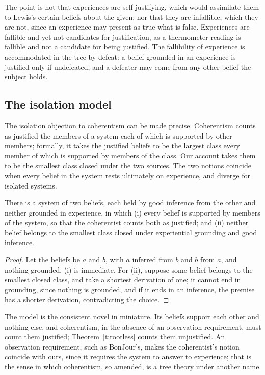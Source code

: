 \documentclass{situationist-preprint}
\begin{document}
The point is not that experiences are self-justifying, which would assimilate them to Lewis's certain beliefs about the given; nor that they are infallible, which they are not, since an experience may present as true what is false. Experiences are fallible and yet not candidates for justification, as a thermometer reading is fallible and not a candidate for being justified. The fallibility of experience is accommodated in the tree by defeat: a belief grounded in an experience is justified only if undefeated, and a defeater may come from any other belief the subject holds.

\subsection{The isolation model}

The isolation objection to coherentism can be made precise. Coherentism counts as justified the members of a system each of which is supported by other members; formally, it takes the justified beliefs to be the largest class every member of which is supported by members of the class. Our account takes them to be the smallest class closed under the two sources. The two notions coincide when every belief in the system rests ultimately on experience, and diverge for isolated systems.

\begin{proposition}[Isolation]\label{p:isolation}
There is a system of two beliefs, each held by good inference from the other and neither grounded in experience, in which (i) every belief is supported by members of the system, so that the coherentist counts both as justified; and (ii) neither belief belongs to the smallest class closed under experiential grounding and good inference.
\end{proposition}

\begin{proof}
Let the beliefs be $a$ and $b$, with $a$ inferred from $b$ and $b$ from $a$, and nothing grounded. (i) is immediate. For (ii), suppose some belief belongs to the smallest closed class, and take a shortest derivation of one; it cannot end in grounding, since nothing is grounded, and if it ends in an inference, the premise has a shorter derivation, contradicting the choice.
\end{proof}

The model is the consistent novel in miniature. Its beliefs support each other and nothing else, and coherentism, in the absence of an observation requirement, must count them justified; Theorem~\ref{t:rootless} counts them unjustified. An observation requirement, such as BonJour's, makes the coherentist's notion coincide with ours, since it requires the system to answer to experience; that is the sense in which coherentism, so amended, is a tree theory under another name.
\end{document}
